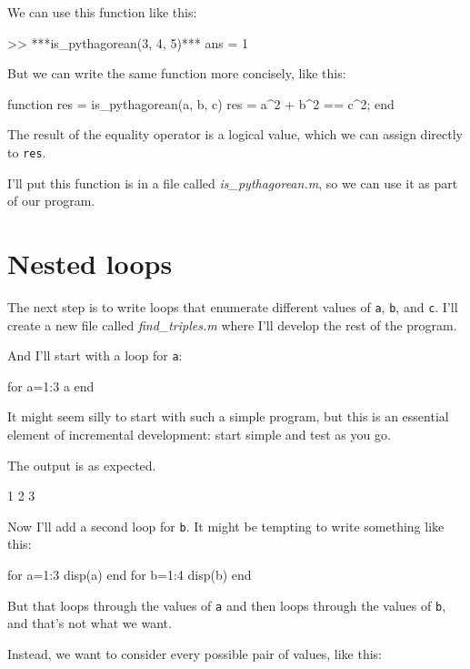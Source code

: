 We can use this function like this:

\begin{code}
>> ***is_pythagorean(3, 4, 5)***
ans = 1
\end{code}

But we can write the same function more concisely, like this:

\begin{code}
function res = is_pythagorean(a, b, c)
    res = a^2 + b^2 == c^2;
end
\end{code}

The result of the equality operator is a logical value, which we can assign directly 
to {\tt res}.

I'll put this function is in a file called {\em is\_pythagorean.m}, so we can use it as part of our program.


\section{Nested loops}

The next step is to write loops that enumerate different values of {\tt a}, {\tt b}, and 
{\tt c}.  I'll create a new file called {\em find\_triples.m} where I'll develop the rest of the program.


And I'll start with a loop for {\tt a}:

\begin{code}
for a=1:3
    a
end
\end{code}

It might seem silly to start with such a simple program, but this is an essential element of incremental development: start simple and test as you go.

The output is as expected.

\begin{code}
1
2
3
\end{code}

Now I'll add a second loop for {\tt b}.  It might be tempting to write something like this:

\begin{code}
for a=1:3
    disp(a)
end
for b=1:4
    disp(b)
end
\end{code}

But that loops through the values of {\tt a} and then loops through the values of {\tt b}, and that's not what we want.

Instead, we want to consider every possible pair of values, like this:

